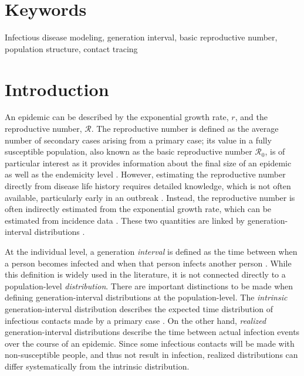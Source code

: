 \documentclass[12pt]{article}
\newcommand{\Rx}[1]{\ensuremath{{\mathcal R}_{#1}}\xspace}
\newcommand{\Ro}{\Rx{0}}
\newcommand{\RR}{\ensuremath{{\mathcal R}}}
\begin{document}
\section*{Keywords}

Infectious disease modeling, generation interval, basic reproductive number, population structure, contact tracing

\pagebreak

\section{Introduction}

An epidemic can be described by the exponential growth rate, $r$, and the reproductive number, \RR.
The reproductive number is defined as the average number of secondary cases arising from a primary case;
its value in a fully susceptible population, also known as the basic reproductive number \Ro, is of particular interest as it provides information about the final size of an epidemic \citep{anderson1991infectious, diekmann1990definition} as well as the endemicity level \citep{kribs2000simple, van2002reproduction, smith2012ross}.
However, estimating the reproductive number directly from disease life history requires detailed knowledge, which is not often available, particularly early in an outbreak \citep{dietz1993estimation}.
Instead, the reproductive number is often indirectly estimated from the exponential growth rate, which can be estimated from incidence data \citep{chowell2003sars, mills2004transmissibility, nishiura2009transmission, nishiura2010pros, ma2014estimating}.
These two quantities are linked by generation-interval distributions \citep{wearing2005appropriate, svensson2007note, roberts2007model, wallinga2007generation, park2019practical}.

At the individual level, a generation \emph{interval} is defined as the time between when a person becomes infected and when that person infects another person \citep{svensson2007note}.
While this definition is widely used in the literature, it is not connected directly to a population-level \emph{distribution}.
There are important distinctions to be made when defining generation-interval distributions at the population-level. The \emph{intrinsic} generation-interval distribution describes the expected time distribution of infectious contacts made by a primary case \citep{champredon2015intrinsic}.
On the other hand, \emph{realized} generation-interval distributions describe the time between actual infection events over the course of an epidemic.
Since some infectious contacts will be made with non-susceptible people, and thus not result in infection, realized distributions can differ systematically from the intrinsic distribution.
\end{document}
